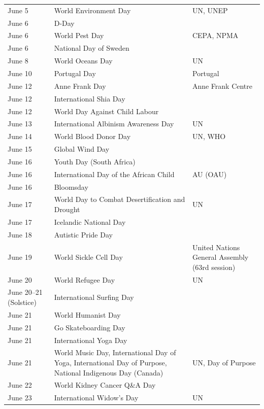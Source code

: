 \documentclass[
  openany]{book}
\begin{document}
\begin{longtable}[t]{>{\raggedright\arraybackslash}p{8em}>{\raggedright\arraybackslash}p{18em}>{\raggedright\arraybackslash}p{10em}}
\rowcolor{gray!6}  June 5 & World Environment Day & UN, UNEP\\
June 6 & D-Day & \\
\rowcolor{gray!6}  June 6 & World Pest Day & CEPA, NPMA\\
June 6 & National Day of Sweden & \\
\rowcolor{gray!6}  June 8 & World Oceans Day & UN\\
\addlinespace
June 10 & Portugal Day & Portugal\\
\rowcolor{gray!6}  June 12 & Anne Frank Day & Anne Frank Centre\\
June 12 & International Shia Day & \\
\rowcolor{gray!6}  June 12 & World Day Against Child Labour & \\
June 13 & International Albinism Awareness Day & UN\\
\addlinespace
\rowcolor{gray!6}  June 14 & World Blood Donor Day & UN, WHO\\
June 15 & Global Wind Day & \\
\rowcolor{gray!6}  June 16 & Youth Day (South Africa) & \\
June 16 & International Day of the African Child & AU (OAU)\\
\rowcolor{gray!6}  June 16 & Bloomsday & \\
\addlinespace
June 17 & World Day to Combat Desertification and Drought & UN\\
\rowcolor{gray!6}  June 17 & Icelandic National Day & \\
June 18 & Autistic Pride Day & \\
\rowcolor{gray!6}  June 19 & World Sickle Cell Day & United Nations General Assembly (63rd session)\\
June 20 & World Refugee Day & UN\\
\addlinespace
\rowcolor{gray!6}  June 20–21 (Solstice) & International Surfing Day & \\
June 21 & World Humanist Day & \\
\rowcolor{gray!6}  June 21 & Go Skateboarding Day & \\
June 21 & International Yoga Day & \\
\rowcolor{gray!6}  June 21 & World Music Day, International Day of Yoga, International Day of Purpose, National Indigenous Day (Canada) & UN, Day of Purpose\\
\addlinespace
June 22 & World Kidney Cancer Q\&A Day & \\
\rowcolor{gray!6}  June 23 & International Widow's Day & UN\\

\end{longtable}
\end{document}
